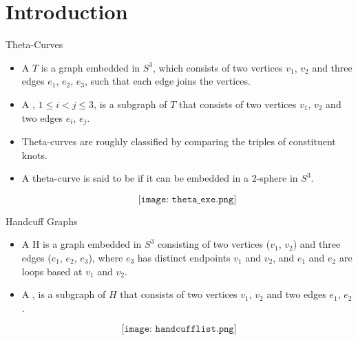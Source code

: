 \section{Introduction}
\begin{frame}{Theta-Curves}
	\begin{itemize}
		\item A  $T$ is a graph embedded in $S^3$,
		which consists of two vertices $v_1$, $v_2$
		and three edges $e_1$, $e_2$, $e_3$,
		such that each edge joins the vertices.
		\item A , $1 \le i < j \le 3$, is a subgraph of $T$
		that consists of two vertices $v_1$, $v_2$ and two edges $e_i$, $e_j$.
		
		\item Theta-curves are roughly classified by comparing the triples of constituent knots.
		
		\item A theta-curve is said to be  if it can be embedded in a 2-sphere in $S^3$.

		$$\texttt{[image: theta\_exe.png]}$$
	\end{itemize}
\end{frame}

\begin{frame}{Handcuff Graphs}
	\begin{itemize}
		\item A  H is a graph embedded in $S^3$ consisting of two vertices ($v_1$, $v_2$) and three edges ($e_1$, $e_2$, $e_3$), where $e_3$ has distinct endpoints $v_1$ and $v_2$, and $e_1$ and $e_2$ are loops based at $v_1$ and $v_2$.
        \item A , is a subgraph of $H$
		that consists of two vertices $v_1$, $v_2$ and two edges $e_1$, $e_2$.

	\end{itemize}

	$$\texttt{[image: handcufflist.png]}$$
\end{frame}

